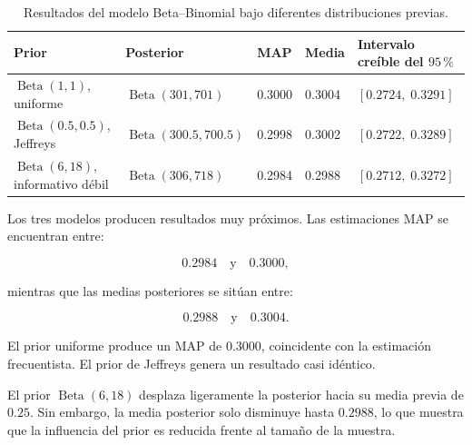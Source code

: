 \begin{table}[H]
    \centering
    \caption{Resultados del modelo Beta--Binomial bajo diferentes
    distribuciones previas.}
    \label{tab:resultados-beta-binomial}

    \small
    \begin{tabularx}{0.98\textwidth}{
        @{}
        >{\raggedright\arraybackslash}p{3.4cm}
        >{\centering\arraybackslash}p{2.5cm}
        >{\centering\arraybackslash}p{1.6cm}
        >{\centering\arraybackslash}p{1.8cm}
        X
        @{}
    }
        \toprule
        Prior
        & Posterior
        & MAP
        & Media
        & Intervalo creíble del \(95\,\%\) \\
        \midrule

        \(\operatorname{Beta}(1,1)\), uniforme
        & \(\operatorname{Beta}(301,701)\)
        & \num{0.3000}
        & \num{0.3004}
        & \([0.2724,\;0.3291]\) \\

        \(\operatorname{Beta}(0.5,0.5)\), Jeffreys
        & \(\operatorname{Beta}(300.5,700.5)\)
        & \num{0.2998}
        & \num{0.3002}
        & \([0.2722,\;0.3289]\) \\

        \(\operatorname{Beta}(6,18)\), informativo débil
        & \(\operatorname{Beta}(306,718)\)
        & \num{0.2984}
        & \num{0.2988}
        & \([0.2712,\;0.3272]\) \\

        \bottomrule
    \end{tabularx}
\end{table}

Los tres modelos producen resultados muy próximos. Las estimaciones MAP
se encuentran entre:

\[
0.2984
\quad\text{y}\quad
0.3000,
\]

mientras que las medias posteriores se sitúan entre:

\[
0.2988
\quad\text{y}\quad
0.3004.
\]

El prior uniforme produce un MAP de \(0.3000\), coincidente con la
estimación frecuentista. El prior de Jeffreys genera un resultado casi
idéntico.

El prior \(\operatorname{Beta}(6,18)\) desplaza ligeramente la posterior
hacia su media previa de \(0.25\). Sin embargo, la media posterior solo
disminuye hasta \(0.2988\), lo que muestra que la influencia del prior es
reducida frente al tamaño de la muestra.


